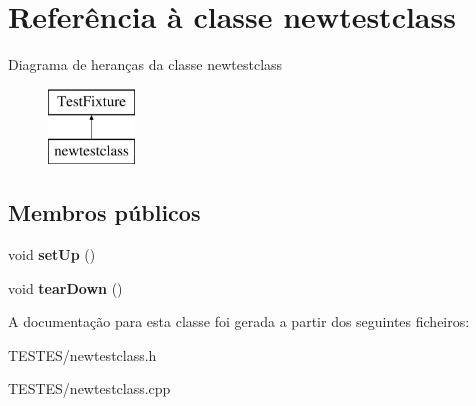 \hypertarget{classnewtestclass}{\section{Referência à classe newtestclass}
\label{classnewtestclass}
}
Diagrama de heranças da classe newtestclass\begin{figure}[H]
\begin{center}
\leavevmode
\includegraphics[height=2.000000cm]{classnewtestclass}
\end{center}
\end{figure}
\subsection*{Membros públicos}
\begin{DoxyCompactItemize}
\item 
\hypertarget{classnewtestclass_a6cb384480c12e6206108923b07dd26ab}{void {\bfseries set\-Up} ()}\label{classnewtestclass_a6cb384480c12e6206108923b07dd26ab}

\item 
\hypertarget{classnewtestclass_a2d3c184b9682089d5bf86e8ea1c33106}{void {\bfseries tear\-Down} ()}\label{classnewtestclass_a2d3c184b9682089d5bf86e8ea1c33106}

\end{DoxyCompactItemize}


A documentação para esta classe foi gerada a partir dos seguintes ficheiros\-:\begin{DoxyCompactItemize}
\item 
T\-E\-S\-T\-E\-S/newtestclass.\-h\item 
T\-E\-S\-T\-E\-S/newtestclass.\-cpp\end{DoxyCompactItemize}
